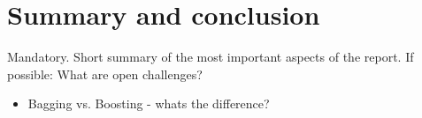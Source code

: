 \section{Summary and conclusion}
Mandatory. Short summary of the most important aspects of the report.
If possible: What are open challenges?

\begin{itemize}
    \item Bagging vs. Boosting - whats the difference?
\end{itemize}


%
%
%
%
